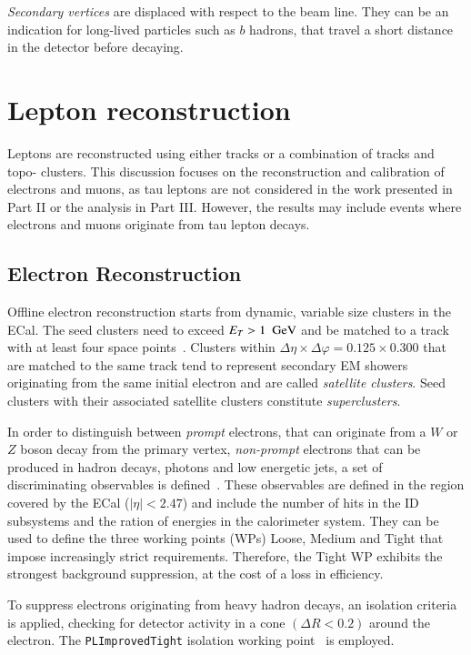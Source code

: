 \textit{Secondary vertices} are displaced with respect to the beam line.
They can be an indication for long-lived particles such as $b$ hadrons, that travel a short distance in the detector before decaying.

\section{Lepton reconstruction}
\label{sec:lep_defintion}
Leptons are reconstructed using either tracks or a combination of tracks and topo-
clusters. This discussion focuses on the reconstruction and calibration of electrons
and muons, as tau leptons are not considered in the work presented in Part II or the
analysis in Part III. However, the results may include events where electrons and
muons originate from tau lepton decays.

\subsection{Electron Reconstruction}
\label{sec:reco:el}
Offline electron reconstruction starts from dynamic, variable size clusters in the
ECal. The seed clusters need to exceed $E_T > 1~~\text{GeV}$ and be matched to a track with at least four space points~\cite{EGAM-2018-01}.
Clusters within $\Delta\eta\times\Delta\varphi = 0.125\times 0.300$
that are matched to the same track tend to represent secondary EM showers originating from the same initial electron and are called \textit{satellite clusters}.
Seed clusters with their associated satellite clusters constitute \textit{superclusters}.

In order to distinguish between \textit{prompt} electrons, that can originate from a $W$ or $Z$ boson decay from the primary vertex, \textit{non-prompt} electrons
that can be produced in hadron decays, photons and low energetic jets, a set of discriminating observables is defined~\cite{PERF-2017-01, EGAM-2018-01}. 
These observables are defined in the region covered by the ECal ($|\eta|<2.47$) and include the number of hits in the ID subsystems and the ration of
energies in the calorimeter system. 
They can be used to define the three working points (WPs) Loose, Medium and Tight
that impose increasingly strict requirements.
Therefore, the Tight WP exhibits the strongest background suppression, at the cost of a loss in efficiency.

To suppress electrons originating from heavy hadron decays, 
an isolation criteria is applied, checking for detector activity in a cone $(\Delta R < 0.2)$ around the electron.
The \texttt{PLImprovedTight} isolation working point~\cite{web:PLImprovedWPs} is employed.

